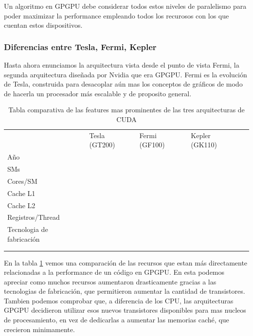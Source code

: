 Un algoritmo en GPGPU debe considerar todos estos niveles de paralelismo para poder maximizar la
performance empleando todos los recurosos con los que cuentan estos dispositivos.

\subsubsection{Diferencias entre Tesla, Fermi, Kepler}

Hasta ahora enunciamos la arquitectura vista desde el punto de vista Fermi, la segunda
arquitectura dise\~nada por Nvidia que era GPGPU. Fermi es la evoluci\'on de Tesla,
construida para desacoplar a\'un mas los conceptos de gr\'aficos de modo de hacerla
un procesador m\'as escalable y de proposito general.

\begin{table}[h]
\caption{Tabla comparativa de las features mas prominentes de las tres arquitecturas de CUDA}
\label{tab:CudaGenerations}
\begin{tabular}{lllll}
                 & Tesla (GT200) & Fermi (GF100) & Kepler (GK110) &  \\
A\~no            &               &               &                &  \\
SMs              &               &               &                &  \\
Cores/SM         &               &               &                &  \\
Cache L1         &               &               &                &  \\
Cache L2         &               &               &                &  \\
Registros/Thread &               &               &                &  \\
Tecnologia de fabricaci\'on &    &               &                &  \\
                 &               &               &                &  \\
                 &               &               &                &
\end{tabular}
\end{table}

En la tabla \ref{tab:CudaGenerations} vemos una comparaci\'on de las recursos que estan m\'as directamente
relacionadas a la performance de un c\'odigo en GPGPU. En esta podemos apreciar como muchos recursos
aumentaron drasticamente gracias a las tecnologias de fabricaci\'on, que permitieron aumentar la
cantidad de transistores. Tambien podemos comprobar que, a diferencia de los CPU, las arquitecturas GPGPU
decidieron utilizar esos nuevos transistores disponibles para mas nucleos de procesamiento, en vez
de dedicarlas a aumentar las memorias cach\'e, que crecieron minimamente.


